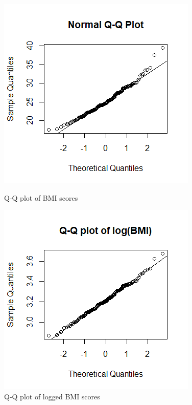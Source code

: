 \begin{figure}[h!]
    \centering
    \includegraphics[scale=1]{root/Normal_q_q_plot.png}
    \caption{Q-Q plot of BMI scores}
    \label{normalqq}
    \includegraphics[scale=1]{root/q_q_plot_log.png}
    \caption{Q-Q plot of logged BMI scores}
    \label{logqq}
\end{figure}
